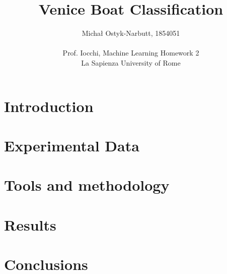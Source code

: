 \documentclass[12pt,a4paper]{article}
\begin{document}
\title{Venice Boat Classification}
\author{Michał Ostyk-Narbutt, 1854051 \\ \\ Prof. Iocchi, Machine Learning Homework 2 \\  La Sapienza University of Rome}

\maketitle
\tableofcontents
\clearpage
\section{Introduction}
\section{Experimental Data}
\section{Tools and methodology}
\section{Results}
\section{Conclusions}
\end{document}
